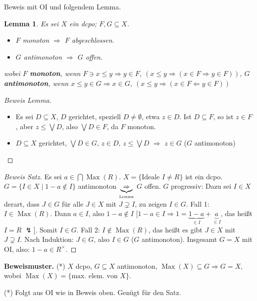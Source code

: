 \documentclass[headsepline=true,DIV=11]{scrartcl}
\newtheorem*{lemma}{Lemma}
\theoremstyle{definition}
\newcommand{\Max}{\operatorname{Max}}
\begin{document}
Beweis mit OI und folgendem Lemma.

\begin{lemma}
  Es sei $X$ ein dcpo; $F,G\subseteq X$.
  \begin{itemize}
    \item[a.] $F$ monoton $\Rightarrow$ $F$ abgeschlossen.
    \item[b.] $G$ antimonoton $\Rightarrow$ $G$ offen.
  \end{itemize}
  wobei $F$ {\bf monoton}, wenn $F\ni x\le y\Rightarrow y\in F$, $(x\le y \Rightarrow (x\in F\Rightarrow y\in F))$, $G$ {\bf antimonoton}, wenn $x\le
  y\in G\Rightarrow x\in G$, $(x\le y\Rightarrow (x\in F\Leftarrow y\in F))$
\end{lemma}

\begin{proof}[Beweis Lemma]
  $\phantom{a}$
  \begin{itemize}
    \item[a.] Es sei $D\subseteq X$, $D$ gerichtet, speziell $D\neq\emptyset$, etwa $z\in D$. Ist $D\subseteq F$, so ist $z\in F$, aber $z\le\bigvee
      D$, also $\bigvee D\in F$, da $F$ monoton.
    \item[b.] $D\subseteq X$ gerichtet, $\bigvee D\in G$, $z\in D$, $z\le\bigvee D$ $\Rightarrow$ $z\in G$ ($G$ antimonoton)
  \end{itemize}
\end{proof}

\begin{proof}[Beweis Satz]
  Es sei $a\in\bigcap\Max(R)$. $X=\{\mbox{Ideale }I\neq R\}$ ist ein dcpo. $G=\{I\in X\mid 1-a\not\in I\}$ antimonoton
  $\underbrace{\Rightarrow}_{\mbox{\tiny Lemma}}$ $G$ offen. $G$ progressiv: Dazu sei $I\in X$ derart, dass $J\in G$ für alle $J\in X$ mit
  $J\supsetneq I$, zu zeigen $I\in G$. Fall 1: $I\in\Max(R)$. Dann $a\in I$, also $1-a\not\in I$ [$1-a\in I\Rightarrow 1=\underbrace{1-a}_{\in
      I}+\underbrace{a}_{\in I}$, das heißt $I=R$ $\lightning$]. Somit $I\in G$. Fall 2: $I\not\in\Max(R)$, das heißt es gibt $J\in X$ mit
  $J\supsetneq I$. Nach Induktion: $J\in G$, also $I\in G$ ($G$ antimonoton). Insgesamt $G=X$ mit OI, also: $1-a\in R^\times$.
\end{proof}

{\bf Beweismuster.} (*) $X$ dcpo, $G\subseteq X$ antimonoton, $\Max(X)\subseteq G\Rightarrow G=X$, wobei $\Max(X)=\{\mbox{max. elem. von }X\}$.

(*) Folgt aus OI wie in Beweis oben. Genügt für den Satz.
\end{document}
